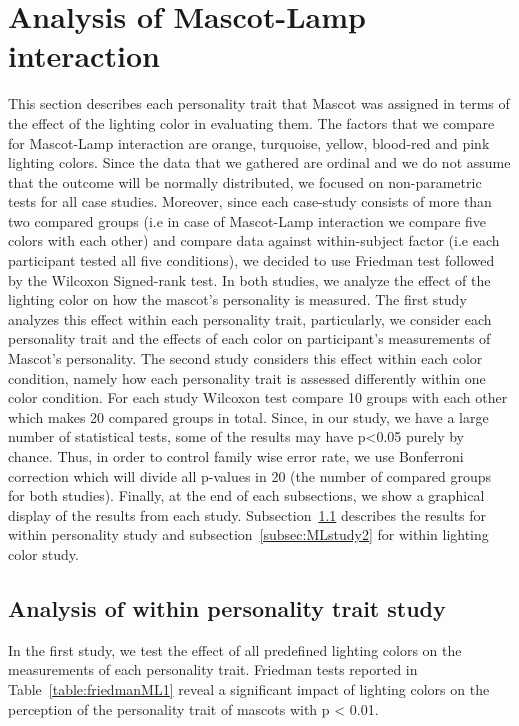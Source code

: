 \section{Analysis of Mascot-Lamp interaction}
\label{sec:m-l}
This section describes each personality trait that Mascot was assigned in terms of
the effect of the lighting color in evaluating them.
The factors that we compare for Mascot-Lamp interaction are orange, turquoise,
yellow, blood-red and pink lighting colors.
Since the data that we gathered are ordinal and we do not assume that the outcome
will be normally distributed, we focused on non-parametric tests for all case studies.
Moreover, since each case-study consists of more than two compared groups
(i.e in case of Mascot-Lamp interaction we compare five colors with each other)
and compare data against within-subject factor (i.e each participant tested all five conditions),
we decided to use Friedman test followed by the Wilcoxon Signed-rank test.
In both studies, we analyze the effect of the lighting color on how the mascot’s personality is measured.
The first study analyzes this effect within each personality trait, particularly, we consider each
personality trait and the effects of each color on participant's measurements of Mascot's personality.
The second study considers this effect within each color condition,
namely how each personality trait is assessed differently within one color condition.
For each study Wilcoxon test compare 10 groups with each other which makes 20 compared groups in total.
Since, in our study, we have a large number of statistical tests, some of the results may have p<0.05 purely by chance.
Thus, in order to control family wise error rate, we use Bonferroni correction which will
divide all p-values in 20 (the number of compared groups for both studies).
Finally, at the end of each subsections, we show a graphical display of the results from each study.
Subsection~\ref{subsec:MLstudy1} describes the results for within personality study and
subsection~\ref{subsec:MLstudy2} for within lighting color study.

\subsection{Analysis of within personality trait study}
\label{subsec:MLstudy1}
In the first study, we test the effect of all predefined lighting colors on the measurements of each personality trait.
Friedman tests reported in Table~\ref{table:friedmanML1} reveal a significant impact of lighting colors on the perception
of the personality trait of mascots with p < 0.01.

